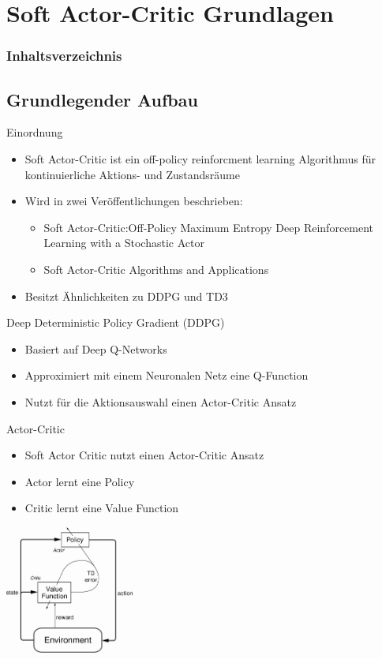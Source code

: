 \section{Soft Actor-Critic Grundlagen}
\begin{frame}
    \frametitle{Inhaltsverzeichnis}
    \tableofcontents[currentsection]
\end{frame}

\subsection{Grundlegender Aufbau}
\begin{frame}{Einordnung}
	\begin{itemize}
		\item Soft Actor-Critic ist ein off-policy reinforcment learning Algorithmus für kontinuierliche Aktions- und Zustandsräume 
		\item Wird in zwei Veröffentlichungen beschrieben:
		\begin{itemize}
			\item Soft Actor-Critic:Off-Policy Maximum Entropy Deep Reinforcement Learning with a Stochastic Actor
			\item Soft Actor-Critic Algorithms and Applications
		\end{itemize}
		\item Besitzt Ähnlichkeiten zu DDPG und TD3 
	\end{itemize} 
\end{frame}

\begin{frame}{Deep Deterministic Policy Gradient (DDPG)}
	\begin{itemize}
		\item Basiert auf Deep Q-Networks
		\item Approximiert mit einem Neuronalen Netz eine Q-Function
		\item Nutzt für die Aktionsauswahl einen Actor-Critic Ansatz
	\end{itemize} 
\end{frame}

\begin{frame}{Actor-Critic}
	\begin{itemize}
		\item Soft Actor Critic nutzt einen Actor-Critic Ansatz
		\item Actor lernt eine Policy
		\item Critic lernt eine Value Function
	\end{itemize} 
	\includegraphics[width=120pt]{figures/figtmp34.png}
	\cite{actorcritic}
\end{frame}

